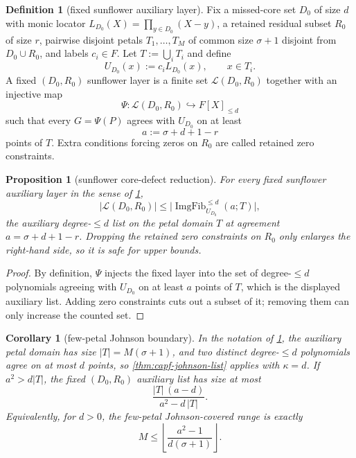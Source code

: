 \documentclass[11pt]{article}
\newtheorem{proposition}[proposition]{Proposition}
\newtheorem{corollary}[corollary]{Corollary}
\theoremstyle{definition}
\newtheorem{definition}[definition]{Definition}
\theoremstyle{remark}
\providecommand{\ImgFib}{\operatorname{ImgFib}}
\providecommand{\floor}[1]{\left\lfloor #1\right\rfloor}
\begin{document}
\begin{definition}[fixed sunflower auxiliary layer]\label{def:capf-sunflower-layer}
Fix a missed-core set $D_0$ of size $d$ with monic locator $L_{D_0}(X)=\prod_{y\in D_0}(X-y)$, a retained residual subset $R_0$ of size $r$, pairwise disjoint petals $T_1,\ldots,T_M$ of common size $\sigma+1$ disjoint from $D_0\cup R_0$, and labels $c_i\in F$.  Let $T:=\bigcup_iT_i$ and define
\[
        U_{D_0}(x):=c_iL_{D_0}(x),\qquad x\in T_i.
\]
A fixed $(D_0,R_0)$ sunflower layer is a finite set $\mathcal L(D_0,R_0)$ together with an injective map
\[
        \Psi:\mathcal L(D_0,R_0)\hookrightarrow F[X]_{\le d}
\]
such that every $G=\Psi(P)$ agrees with $U_{D_0}$ on at least
\[
        a:=\sigma+d+1-r
\]
points of $T$.  Extra conditions forcing zeros on $R_0$ are called retained zero constraints.
\end{definition}

\begin{proposition}[sunflower core-defect reduction]\label{prop:capf-pma}
For every fixed sunflower auxiliary layer in the sense of \cref{def:capf-sunflower-layer},
\[
        |\mathcal L(D_0,R_0)|
        \le
        \bigl|\ImgFib_{U_{D_0}}^{\le d}(a;T)\bigr|,
\]
the auxiliary degree-$\le d$ list on the petal domain $T$ at agreement $a=\sigma+d+1-r$.  Dropping the retained zero constraints on $R_0$ only enlarges the right-hand side, so it is safe for upper bounds.
\end{proposition}

\begin{proof}
By definition, $\Psi$ injects the fixed layer into the set of degree-$\le d$ polynomials agreeing with $U_{D_0}$ on at least $a$ points of $T$, which is the displayed auxiliary list.  Adding zero constraints cuts out a subset of it; removing them can only increase the counted set.
\end{proof}

\begin{corollary}[few-petal Johnson boundary]\label{cor:capf-pma-johnson}
In the notation of \cref{prop:capf-pma}, the auxiliary petal domain has size $|T|=M(\sigma+1)$, and two distinct degree-$\le d$ polynomials agree on at most $d$ points, so \cref{thm:capf-johnson-list} applies with $\kappa=d$.  If $a^2>d|T|$, the fixed $(D_0,R_0)$ auxiliary list has size at most
\[
        \frac{|T|\,(a-d)}{a^2-d\,|T|}.
\]
Equivalently, for $d>0$, the few-petal Johnson-covered range is exactly
\[
        M\le
        \floor{\frac{a^2-1}{d(\sigma+1)}}.
\]
\end{corollary}
\end{document}
